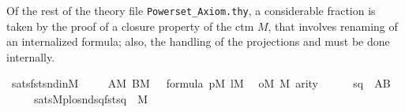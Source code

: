 Of the rest of the theory file \verb|Powerset_Axiom.thy|, a
considerable fraction is taken by the proof of a closure property of
the ctm $M$, that involves renaming of an internalized formula; also,
the handling of the projections  and  must be
done internally. 
\begin{isabelle}
\isamarkupfalse%
\ sats{\isacharunderscore}fst{\isacharunderscore}snd{\isacharunderscore}in{\isacharunderscore}M{\isacharcolon}\isanewline
\ \ \isanewline
\  \ {\isachardoublequoteopen}A{\isasymin}M{\isachardoublequoteclose}\ {\isachardoublequoteopen}B{\isasymin}M{\isachardoublequoteclose}\ {\isachardoublequoteopen}{\isasymphi}\ {\isasymin}\ formula{\isachardoublequoteclose}\ {\isachardoublequoteopen}p{\isasymin}M{\isachardoublequoteclose}\ {\isachardoublequoteopen}l{\isasymin}M{\isachardoublequoteclose}\isanewline
\ \  {\isachardoublequoteopen}o{\isasymin}M{\isachardoublequoteclose}\ {\isachardoublequoteopen}{\isasymchi}{\isasymin}M{\isachardoublequoteclose}\ {\isachardoublequoteopen}arity{\isacharparenleft}{\isasymphi}{\isacharparenright}\ {\isasymle}\ {}{\isachardoublequoteclose}\isanewline
\  \isanewline
\  \ {\isachardoublequoteopen}{\isacharbraceleft}sq\ {\isasymin}\ A{\isasymtimes}B\ {\isachardot}\isanewline
\ \ \ \ \ sats{\isacharparenleft}M{\isacharcomma}{\isasymphi}{\isacharcomma}{\isacharbrackleft}p{\isacharcomma}l{\isacharcomma}o{\isacharcomma}snd{\isacharparenleft}sq{\isacharparenright}{\isacharcomma}fst{\isacharparenleft}sq{\isacharparenright}{\isacharcomma}{\isasymchi}{\isacharbrackright}{\isacharparenright}{\isacharbraceright}\ {\isasymin}\ M{\isachardoublequoteclose}\ \isanewline
\end{isabelle}


